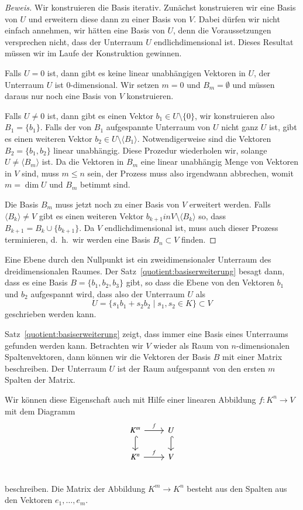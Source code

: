 \begin{proof}[Beweis]
Wir konstruieren die Basis iterativ.
Zunächst konstruieren wir eine Basis von $U$ und erweitern diese dann
zu einer Basis von $V$.
Dabei dürfen wir nicht einfach annehmen, wir hätten eine Basis von $U$,
denn die Voraussetzungen versprechen nicht, dass der Unterraum $U$
endlichdimensional ist.
Dieses Resultat müssen wir im Laufe der Konstruktion gewinnen.

Falls $U=0$ ist, dann gibt es keine linear unabhängigen Vektoren in $U$,
der Unterraum $U$ ist $0$-dimensional.
Wir setzen $m=0$ und $B_m=\emptyset$ und müssen daraus nur noch eine Basis
von $V$ konstruieren.

Falls $U\ne 0$ ist, dann gibt es einen Vektor $b_1\in U\setminus\{0\}$,
wir konstruieren also $B_1=\{b_1\}$.
Falls der von $B_1$ aufgespannte Unterraum von $U$ nicht ganz $U$ ist, gibt
es einen weiteren Vektor $b_2\in U\setminus\langle B_1\rangle$.
Notwendigerweise sind die Vektoren $B_2=\{b_1,b_2\}$ linear unabhängig.
Diese Prozedur wiederholen wir, solange $U\ne \langle B_m\rangle$ ist.
Da die Vektoren in $B_m$ eine linear unabhängig Menge von Vektoren in $V$
sind, muss $m\le n$ sein, der Prozess muss also irgendwann abbrechen,
womit $m=\operatorname{dim}U$ und $B_m$ betimmt sind.

Die Basis $B_m$ muss jetzt noch zu einer Basis von $V$ erweitert werden.
Falls $\langle B_k\rangle\ne V$ gibt es einen weiteren
Vektor $b_{k+1} in V\setminus\langle B_k\rangle$ so, dass 
$B_{k+1}=B_k\cup\{b_{k+1}\}$.
Da $V$ endlichdimensional ist, muss auch dieser Prozess terminieren,
d.~h.~wir werden eine Basis $B_n\subset V$ finden.
\end{proof}

Eine Ebene durch den Nullpunkt ist ein zweidimensionaler Unterraum 
des dreidimensionalen Raumes.
Der Satz~\ref{quotient:basiserweiterung} besagt dann, dass es eine
Basis $B=\{b_1,b_2,b_3\}$ gibt, so dass die Ebene von den Vektoren
$b_1$ und $b_2$ aufgespannt wird,
dass also der Unterraum $U$ als
\[
U=\{s_1b_1+s_2b_2\;|\; s_1,s_2\in K\} \subset V
\]
geschrieben werden kann.

Satz~\ref{quotient:basiserweiterung} zeigt, dass immer eine Basis eines
Unterraums gefunden werden kann.
Betrachten wir $V$ wieder als Raum von $n$-dimensionalen Spaltenvektoren,
dann können wir die Vektoren der Basis $B$ mit einer Matrix beschreiben.
Der Unterraum $U$ ist der Raum aufgespannt von den ersten $m$ Spalten
der Matrix.

Wir können diese Eigenschaft auch mit Hilfe einer linearen Abbildung
$f\colon K^n\to V$
mit dem Diagramm
\[
 \begin{tikzcd} {K^m} \arrow[r,"f"] \arrow[d,hook] & U \arrow[d,hook] \\
  {K^n} \arrow[r,"f"]              & V \\
 \end{tikzcd}
\]
beschreiben.
Die Matrix der Abbildung $K^m \to K^n$ besteht aus den Spalten aus den
Vektoren $e_1,\dots,e_m$.

